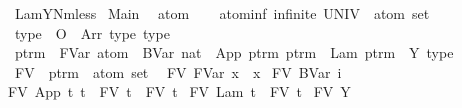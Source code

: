 %
\begin{isabellebody}%
%
%
\isamarkuptrue%
%
\isadelimtheory
%
\endisadelimtheory
%
\isatagtheory
{}\isamarkupfalse%
\ LamYNmless\isanewline
{}\ Main\ %
\endisatagtheory
{\isafoldtheory}%
%
\isadelimtheory
%
\endisadelimtheory
%
\isamarkuptrue%
\isamarkupfalse%
\ atom\isanewline
\isanewline
{}\isamarkupfalse%
\ \isanewline
\ \ atom{\isacharunderscore}inf{\isacharcolon}\ {\isachardoublequoteopen}infinite\ {\isacharparenleft}UNIV\ {\isacharcolon}{\isacharcolon}\ atom\ set{\isacharparenright}{\isachardoublequoteclose}\isanewline
\isanewline
{}\isamarkupfalse%
\ type\ {\isacharequal}\ O\ {\isacharbar}\ Arr\ type\ type\ {\isacharparenleft}{\isachardoublequoteopen}{\isacharunderscore}\ {\isasymrightarrow}\ {\isacharunderscore}{\isachardoublequoteclose}{\isacharparenright}\isanewline
\isanewline
{}\isamarkupfalse%
\ ptrm\ {\isacharequal}\ FVar\ atom\ {\isacharbar}\ BVar\ nat\ {\isacharbar}\ App\ ptrm\ ptrm\ {\isacharbar}\ Lam\ ptrm\ {\isacharbar}\ Y\ type\isanewline
\isanewline
{}\isamarkupfalse%
\ FV\ {\isacharcolon}{\isacharcolon}\ {\isachardoublequoteopen}ptrm\ {\isasymRightarrow}\ atom\ set{\isachardoublequoteclose}\ \ \isanewline
{\isachardoublequoteopen}FV\ {\isacharparenleft}FVar\ x{\isacharparenright}\ {\isacharequal}\ {\isacharbraceleft}x{\isacharbraceright}{\isachardoublequoteclose}\ {\isacharbar}\isanewline
{\isachardoublequoteopen}FV\ {\isacharparenleft}BVar\ i{\isacharparenright}\ {\isacharequal}\ {\isacharbraceleft}{\isacharbraceright}{\isachardoublequoteclose}\ {\isacharbar}\isanewline
{\isachardoublequoteopen}FV\ {\isacharparenleft}App\ t{}\ t{}{\isacharparenright}\ {\isacharequal}\ {\isacharparenleft}FV\ t{}{\isacharparenright}\ {\isasymunion}\ {\isacharparenleft}FV\ t{}{\isacharparenright}{\isachardoublequoteclose}\ {\isacharbar}\isanewline
{\isachardoublequoteopen}FV\ {\isacharparenleft}Lam\ t{\isacharparenright}\ {\isacharequal}\ FV\ t{\isachardoublequoteclose}\ {\isacharbar}\isanewline
{\isachardoublequoteopen}FV\ {\isacharparenleft}Y\ {\isasymsigma}{\isacharparenright}\ {\isacharequal}\ {\isacharbraceleft}{\isacharbraceright}{\isachardoublequoteclose}%
\isamarkuptrue%

\end{isabellebody}
